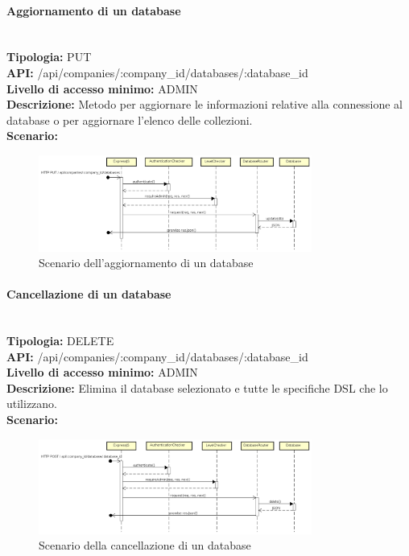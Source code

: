 \newpage
\paragraph{Aggiornamento di un database}\mbox{}\\
\textbf{Tipologia:} PUT \\
\textbf{API:} /api/companies/:company\_id/databases/:database\_id \\
\textbf{Livello di accesso minimo:} ADMIN \\
\textbf{Descrizione:} Metodo per aggiornare le informazioni relative alla connessione al database o per aggiornare l'elenco delle collezioni. \\
\textbf{Scenario:}
\begin{figure}[H]
\centering
\includegraphics[width=0.8\textwidth]{res/sections/backend/sequence/(PUT)database.png}
\caption{Scenario dell'aggiornamento di un database}
\end{figure}

\newpage
\paragraph{Cancellazione di un database}\mbox{}\\
\textbf{Tipologia:} DELETE \\
\textbf{API:} /api/companies/:company\_id/databases/:database\_id \\
\textbf{Livello di accesso minimo:} ADMIN \\
\textbf{Descrizione:} Elimina il database selezionato e tutte le specifiche DSL che lo utilizzano. \\
\textbf{Scenario:} 
\begin{figure}[H]
\centering
\includegraphics[width=0.8\textwidth]{res/sections/backend/sequence/(DELETE)database.png}
\caption{Scenario della cancellazione di un database}
\end{figure}

